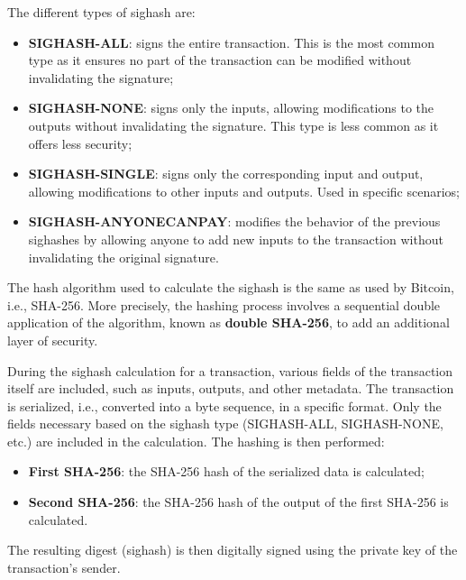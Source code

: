 \noindent The different types of sighash are:
\begin{itemize}
    \item \textbf{SIGHASH-ALL}: signs the entire transaction. This is the most common type as it ensures no part of the transaction can be modified without invalidating the signature;
    \item \textbf{SIGHASH-NONE}: signs only the inputs, allowing modifications to the outputs without invalidating the signature. This type is less common as it offers less security;
    \item \textbf{SIGHASH-SINGLE}: signs only the corresponding input and output, allowing modifications to other inputs and outputs. Used in specific scenarios;
    \item \textbf{SIGHASH-ANYONECANPAY}: modifies the behavior of the previous sighashes by allowing anyone to add new inputs to the transaction without invalidating the original signature.
\end{itemize}

\noindent The hash algorithm used to calculate the sighash is the same as used by Bitcoin, i.e., SHA-256. More precisely, the hashing process involves a sequential double application of the algorithm, known as \textbf{double SHA-256}, to add an additional layer of security.

\noindent During the sighash calculation for a transaction, various fields of the transaction itself are included, such as inputs, outputs, and other metadata. The transaction is serialized, i.e., converted into a byte sequence, in a specific format. Only the fields necessary based on the sighash type (SIGHASH-ALL, SIGHASH-NONE, etc.) are included in the calculation. The hashing is then performed:
\begin{itemize}
    \item \textbf{First SHA-256}: the SHA-256 hash of the serialized data is calculated;
    \item \textbf{Second SHA-256}: the SHA-256 hash of the output of the first SHA-256 is calculated.
\end{itemize}

\noindent The resulting digest (sighash) is then digitally signed using the private key of the transaction's sender.